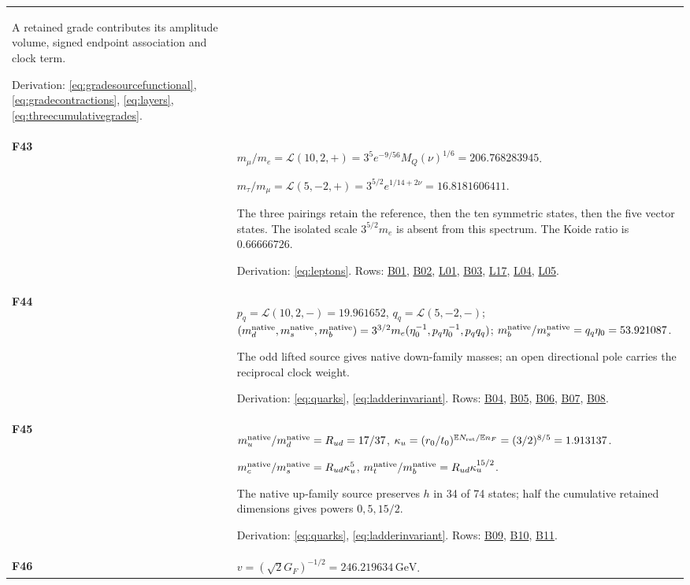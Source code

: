 \documentclass[aps,prx,onecolumn,10pt,notitlepage,nofootinbib,longbibliography]{revtex4-2}
\numberwithin{equation}{section}
\numberwithin{table}{section}
\newcommand{\EE}{\mathbb E}
\newcommand{\GeV}{\,\mathrm{GeV}}
\begin{document}
\begin{longtable}{@{}>{\raggedright\arraybackslash}p{}>{\raggedright\arraybackslash}p{}@{}}
A retained grade contributes its amplitude volume, signed endpoint association and clock term.\par
Derivation: \eqref{eq:gradesourcefunctional}, \eqref{eq:gradecontractions}, \eqref{eq:layers}, \eqref{eq:threecumulativegrades}. \\[7pt]
\hypertarget{formula-F43}{}\textbf{F43}\label{formula:F43} & $m_\mu/m_e=\mathcal L(10,2,+)=3^5e^{-9/56}M_Q(\nu)^{1/6}=206.768283945$.\par $m_\tau/m_\mu=\mathcal L(5,-2,+)=3^{5/2}e^{1/14+2\nu}=16.8181606411$.\par
The three pairings retain the reference, then the ten symmetric states, then the five vector states. The isolated scale $3^{5/2}m_e$ is absent from this spectrum. The Koide ratio is $0.66666726$.\par
Derivation: \eqref{eq:leptons}. Rows: \hyperlink{row-B01}{B01}, \hyperlink{row-B02}{B02}, \hyperlink{row-L01}{L01}, \hyperlink{row-B03}{B03}, \hyperlink{row-L17}{L17}, \hyperlink{row-L04}{L04}, \hyperlink{row-L05}{L05}.\\[7pt]
\hypertarget{formula-F44}{}\textbf{F44}\label{formula:F44} & $p_q=\mathcal L(10,2,-)=19.961652$, $q_q=\mathcal L(5,-2,-)$; $(m_d^{\rm native},m_s^{\rm native},m_b^{\rm native})=3^{3/2}m_e(\eta_0^{-1},p_q\eta_0^{-1},p_q q_q)$; $m_b^{\rm native}/m_s^{\rm native}=q_q\eta_0=53.921087$.\par
The odd lifted source gives native down-family masses; an open directional pole carries the reciprocal clock weight.\par
Derivation: \eqref{eq:quarks}, \eqref{eq:ladderinvariant}. Rows: \hyperlink{row-B04}{B04}, \hyperlink{row-B05}{B05}, \hyperlink{row-B06}{B06}, \hyperlink{row-B07}{B07}, \hyperlink{row-B08}{B08}.\\[7pt]
\hypertarget{formula-F45}{}\textbf{F45}\label{formula:F45} & $m_u^{\rm native}/m_d^{\rm native}=R_{ud}=17/37$, $\kappa_u=(r_0/t_0)^{\EE N_{\rm ret}/\EE n_F}=(3/2)^{8/5}=1.913137$.\par $m_c^{\rm native}/m_s^{\rm native}=R_{ud}\kappa_u^5$, $m_t^{\rm native}/m_b^{\rm native}=R_{ud}\kappa_u^{15/2}$.\par
The native up-family source preserves $h$ in 34 of 74 states; half the cumulative retained dimensions gives powers $0,5,15/2$.\par
Derivation: \eqref{eq:quarks}, \eqref{eq:ladderinvariant}. Rows: \hyperlink{row-B09}{B09}, \hyperlink{row-B10}{B10}, \hyperlink{row-B11}{B11}.\\[7pt]
\hypertarget{formula-F46}{}\textbf{F46}\label{formula:F46} & $v=(\sqrt2G_F)^{-1/2}=246.219634\GeV$.\par

\end{longtable}
\end{document}
